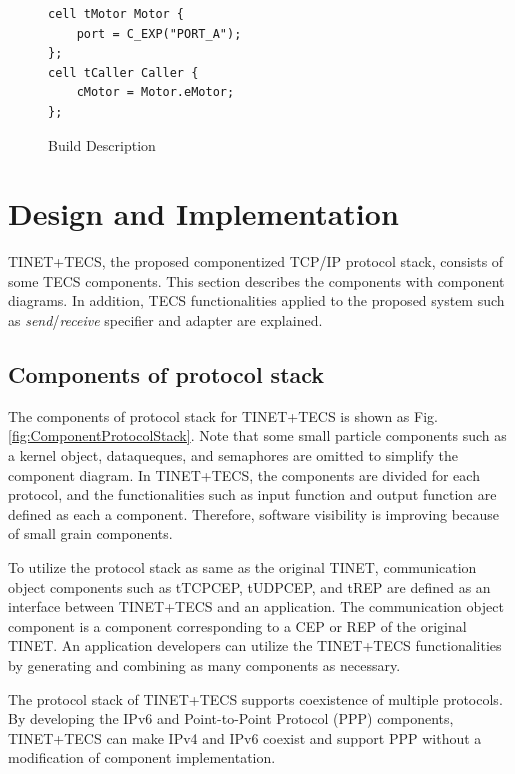 \documentclass[conference]{IEEEtran/IEEEtran}
\begin{document}
\begin{description}
\begin{figure}[t]
\centering
\begin{lstlisting}
cell tMotor Motor {
    port = C_EXP("PORT_A");
};
cell tCaller Caller {
    cMotor = Motor.eMotor;
};
\end{lstlisting}
\caption{Build Description}
\label{build}
\end{figure}

\end{description}

\section{Design and Implementation}
\label{sec:Design and Implementation}

TINET+TECS, the proposed componentized TCP/IP protocol stack, consists of some TECS components.
This section describes the components with component diagrams.
In addition, TECS functionalities applied to the proposed system such as {\it send}/{\it receive} specifier and adapter are explained.

\subsection{Components of protocol stack}

The components of protocol stack for TINET+TECS is shown as Fig. \ref{fig:ComponentProtocolStack}.
Note that some small particle components such as a kernel object, dataqueques, and semaphores are omitted to simplify the component diagram.
In TINET+TECS, the components are divided for each protocol, and the functionalities such as input function and output function are defined as each a component.
Therefore, software visibility is improving because of small grain components.

To utilize the protocol stack as same as the original TINET, communication object components such as tTCPCEP, tUDPCEP, and tREP are defined as an interface between TINET+TECS and an application.
The communication object component is a component corresponding to a CEP or REP of the original TINET.
An application developers can utilize the TINET+TECS functionalities by generating and combining as many components as necessary.

The protocol stack of TINET+TECS supports coexistence of multiple protocols.
By developing the IPv6 and Point-to-Point Protocol (PPP) components, TINET+TECS can make IPv4 and IPv6 coexist and support PPP without a modification of component implementation.
\end{document}
